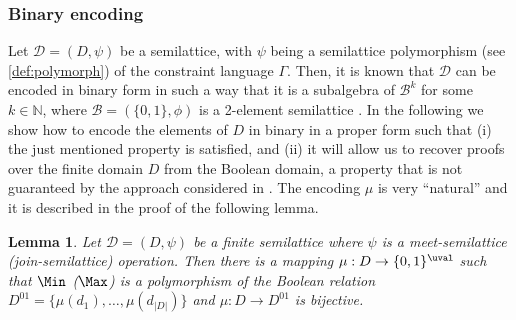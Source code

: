 \documentclass[11pt]{article}
\newtheorem{lemma}[theorem]{Lemma}
\begin{document}
\subsubsection{Binary encoding}\label{sect:binencoding}
{Let} $\mathcal{D} = (D,\psi)$ {be} a semilattice{, with} $\psi$ {being} a semilattice polymorphism (see \cref{def:polymorph}) of the constraint language $\Gamma$.
Then, it is known that $\mathcal{D}$ can be encoded in binary form in such a way that it is a subalgebra of $\mathcal{B}^k$ {for some $k \in \mathbb{N}$}, where $\mathcal{B} = (\{0, 1\}, \phi)$ is a 2-element semilattice \cite{DonaPapert1964}.
%
In the following we show how to encode the elements of $D$ in binary in a proper form such that (i) the just mentioned property \cite{DonaPapert1964} is satisfied, and (ii) it will allow us to recover proofs {over the finite domain $D$} from the Boolean domain, a property that is not guaranteed by the approach considered in \cite{BulatovRSTOC22}.
The encoding $\mu$ is very ``natural'' and it is described in the proof of the following lemma.%
%
%
\begin{lemma}\label{th:bin_encoding}
    Let $\mathcal{D} = (D,\psi)$ be a finite semilattice where $\psi$ is a meet-semilattice (join-semilattice) operation. Then there is a mapping $\mu:D\rightarrow \{0,1\}^{\uval}$ such that $\Min$ ($\Max$) is a polymorphism of {the Boolean relation} $D^{01}=\{\mu(d_1),\ldots,\mu(d_{|D|})\}$ and $\mu:D\rightarrow D^{01}$ is bijective.
\end{lemma}
\end{document}

